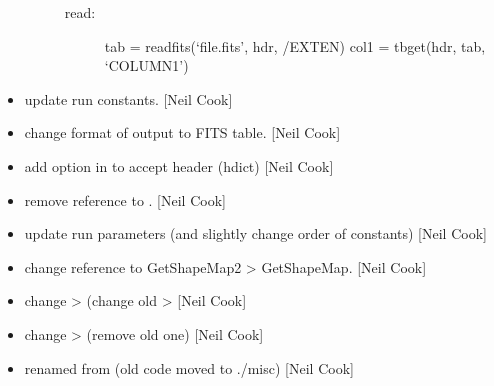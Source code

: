 \documentclass[a4paper,10pt,english]{report}
\begin{document}
\begin{itemize}
\begin{description}
\begin{description}
\item[{read:}] \leavevmode
tab = readfits(‘file.fits’, hdr, /EXTEN)
col1 = tbget(hdr, tab, ‘COLUMN1’)

\end{description}

\end{description}

\item {} 
 \sphinxhyphen{} update  run constants. {[}Neil Cook{]}

\item {} 
 \sphinxhyphen{} change format of output to FITS table. {[}Neil Cook{]}

\item {} 
 \sphinxhyphen{} add option in  to accept header (hdict)
{[}Neil Cook{]}

\item {} 
 \sphinxhyphen{} remove reference to . {[}Neil
Cook{]}

\item {} 
 \sphinxhyphen{} update run parameters (and slightly change order
of constants) {[}Neil Cook{]}

\item {} 
 \sphinxhyphen{} change reference to GetShapeMap2 \textendash{}\textgreater{}
GetShapeMap. {[}Neil Cook{]}

\item {} 
 \sphinxhyphen{} change  \textendash{}\textgreater{}  (change old
 \textendash{}\textgreater{}  {[}Neil Cook{]}

\item {} 
 \sphinxhyphen{} change  \textendash{}\textgreater{} 
(remove old one) {[}Neil Cook{]}

\item {} 
 \sphinxhyphen{} renamed from  (old code
moved to ./misc) {[}Neil Cook{]}

\end{itemize}
\end{document}
